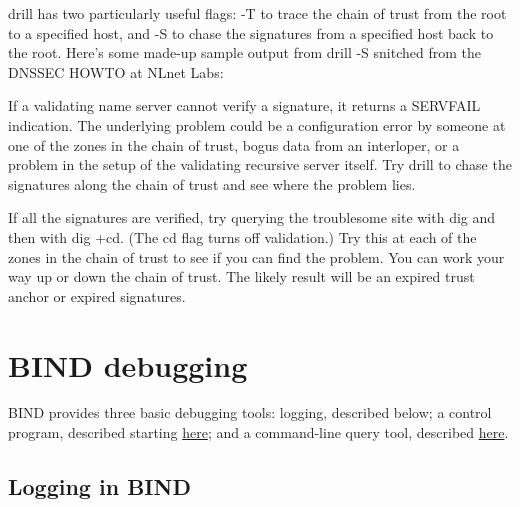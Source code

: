 \protect\hypertarget{part0024_split_068.htmlux5cux23_idIndexMarker2277}{}{}\protect\hypertarget{part0024_split_068.htmlux5cux23_idIndexMarker2278}{}{}{drill}
has two particularly useful flags: {-T} to trace the chain of trust from
the root to a specified host, and {-S} to chase the signatures from a
specified host back to the root. Here's some made-up sample output from
{drill -S }snitched from the {DNSSEC HOWTO} at NLnet Labs:


If a validating name server cannot verify a signature, it returns a
\protect\hypertarget{part0024_split_068.htmlux5cux23_idIndexMarker2279}{}{}SERVFAIL
indication. The underlying problem could be a configuration error by
someone at one of the zones in the chain of trust, bogus data from an
interloper, or a problem in the setup of the validating recursive server
itself. Try {drill} to chase the signatures along the chain of trust and
see where the problem lies.

If all the signatures are verified, try querying the troublesome site
with {dig} and then with {dig +cd}. (The {cd} flag turns off
validation.) Try this at each of the zones in the chain of trust to see
if you can find the problem. You can work your way up or down the chain
of trust. The likely result will be an expired trust anchor or expired
signatures.


\section{BIND debugging}


\protect\hypertarget{part0024_split_069.htmlux5cux23_idIndexMarker2280}{}{}\protect\hypertarget{part0024_split_069.htmlux5cux23_idIndexMarker2281}{}{}\protect\hypertarget{part0024_split_069.htmlux5cux23_idIndexMarker2282}{}{}BIND
provides three basic debugging tools: logging, described below; a
control program, described starting
\protect\hyperlink{part0024_split_071.htmlux5cux23_idTextAnchor964}{here};
and a command-line query tool, described
\protect\hyperlink{part0024_split_072.htmlux5cux23_idTextAnchor966}{here}.

\protect\hypertarget{part0024_split_070.html}{}{}

\hypertarget{part0024_split_070.htmlux5cux23_idContainer1069}{}
\hypertarget{part0024_split_070.htmlux5cux23calibre_pb_69}{%
\subsection[Logging in
BIND]{\texorpdfstring{\protect\hypertarget{part0024_split_070.htmlux5cux23_idTextAnchor955}{}{}Logging
in
BIND}{Logging in BIND}}\label{part0024_split_070.htmlux5cux23calibre_pb_69}}

